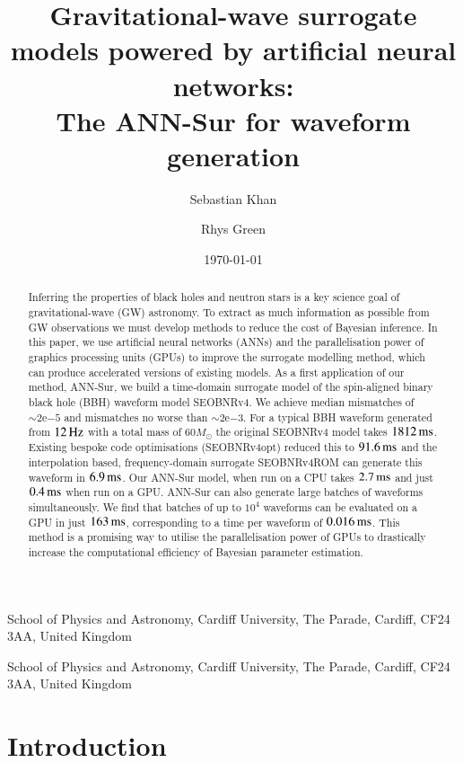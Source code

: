 \documentclass[aps,prd,reprint,superscriptaddress,preprintnumbers,showpacs,nofootinbib]{revtex4-1}
\newcommand{\cardiff}{School of Physics and Astronomy, Cardiff University, The
Parade, Cardiff, CF24 3AA, United Kingdom}
\newcommand{\expnumber}[2]{{#1}\mathrm{e}{#2}}
\begin{document}
\title{Gravitational-wave surrogate models powered by artificial neural networks:\protect\\The ANN-Sur for waveform generation}

\author{Sebastian Khan}
\affiliation\cardiff

\author{Rhys Green}
\affiliation\cardiff


\date{\today}

\begin{abstract}

Inferring the properties of black holes and neutron stars is a key science goal
of gravitational-wave (GW) astronomy. To extract as much information as possible
from GW observations we must develop methods to reduce the cost of Bayesian
inference. In this paper, we use artificial neural networks (ANNs) and the
parallelisation power of graphics processing units (GPUs) to improve the
surrogate modelling method, which can produce accelerated versions of existing
models. As a first application of our method, ANN-Sur, we build a time-domain
surrogate model of the spin-aligned binary black hole (BBH) waveform model
SEOBNRv4. We achieve median mismatches of $\sim \expnumber{2}{-5}$ and
mismatches no worse than $\sim \expnumber{2}{-3}$. For a typical BBH waveform
generated from $12 \,\rm{Hz}$ with a total mass of $60 M_\odot$ the original
SEOBNRv4 model takes $1812 \, {\rm{ms}}$. Existing bespoke code optimisations
(SEOBNRv4opt) reduced this to $91.6 \, {\rm{ms}}$ and the interpolation based,
frequency-domain surrogate SEOBNRv4ROM can generate this waveform in $6.9 \,
{\rm{ms}}$. Our ANN-Sur model, when run on a CPU takes $2.7 \, {\rm{ms}}$ and
just $0.4 \, {\rm{ms}}$ when run on a GPU. ANN-Sur can also generate large
batches of waveforms simultaneously. We find that batches of up to $10^{4}$
waveforms can be evaluated on a GPU in just $163 \, {\rm{ms}}$, corresponding to
a time per waveform of $0.016 \, {\rm{ms}}$. This method is a promising way to
utilise the parallelisation power of GPUs to drastically increase the
computational efficiency of Bayesian parameter estimation.

\end{abstract}

\maketitle

\section{Introduction}
\label{sec:intro}
\end{document}
